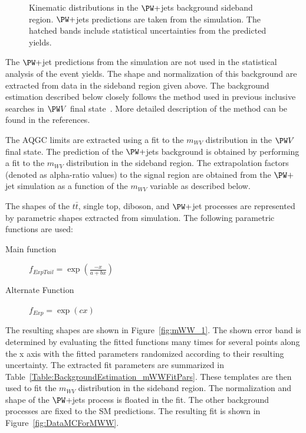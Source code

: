 \begin{figure}[htb]
\caption{Kinematic distributions in the $\PW+$jets background sideband region. $\PW+$jets predictions are taken from the simulation. The hatched bands include statistical uncertainties from the predicted yields.}
\label{fig:wjet_control2}
\end{figure}

The $\PW+$jet predictions from the simulation are not used in the statistical analysis of the event yields. The shape and normalization of this background are extracted from data in the sideband region given above. The background estimation described below closely follows the method used in previous inclusive searches in $\PW V$ final state~\cite{resonances,cmsnote}. More detailed description of the method can be found in the references. 

The AQGC limits are extracted using a fit to the $m_{WV}$ distribution in the $\PW V$ final state. The prediction of the $\PW+$jets background is obtained by performing a fit to the $m_{WV}$ distribution in the sideband region. The extrapolation factors (denoted as alpha-ratio values) to the signal region are obtained from the $\PW+$jet simulation as a function of the $m_{WV}$ variable as described below.   

The shapes of the $t\bar{t}$, single top, diboson, and $\PW+$jet processes are represented by parametric shapes extracted from simulation. The following parametric functions are used: 

\begin{description}
	\item [Main function] $f_{ExpTail} = \exp(\frac{-x}{a+bx})$
	\item [Alternate Function] $f_{Exp} = \exp(cx)$
\end{description}

The resulting shapes are shown in Figure~\ref{fig:mWW_1}. The shown error band is determined by evaluating the fitted functions many times for several points along the x axis with the fitted parameters randomized according to their resulting uncertainty. The extracted fit parameters are summarized in Table~\ref{Table:BackgroundEstimation_mWWFitPars}. These templates are then used to fit the $m_{WV}$ distribution in the sideband region. The normalization and shape of the  $\PW$+jets process is floated in the fit. The other background processes are fixed to the SM predictions. The resulting fit is shown in Figure~\ref{fig:DataMCForMWW}.

